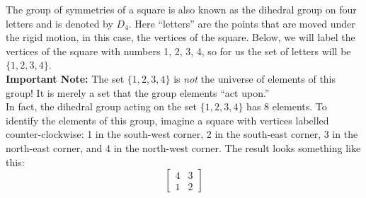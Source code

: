\documentclass[12pt,reqno]{amsart}
\newcommand{\<}{\ensuremath{\langle}}
\renewcommand{\>}{\ensuremath{\rangle}}
\begin{document}
\begin{enumerate}
\medskip

The group of symmetries of a square is also known as the dihedral group on four
letters and is denoted by $D_4$.
Here ``letters'' are the points that are moved under the rigid motion, in this
case, the vertices of the square. Below, we will label the vertices of the
square with numbers 1, 2, 3, 4, so for us the set of letters will be
$\{1,2,3,4\}$.
\\[4pt]
{\bf Important Note:} The set $\{1,2,3,4\}$ is \emph{not} the universe of
elements of this group!  It is merely a set that the group elements ``act
upon.'' 
\\[4pt]
In fact, the dihedral group acting on the set $\{1, 2, 3, 4\}$ has 8 elements. 
To identify the elements of this group, imagine a square with vertices labelled
counter-clockwise: 1 in the south-west corner, 2 in the south-east corner, 3 in
the north-east corner, and 4 in the north-west corner. The result looks
something like this: 
$$\begin{bmatrix} 4 & 3 \\ 1 & 2 \end{bmatrix}$$


\end{enumerate}
\end{document}
